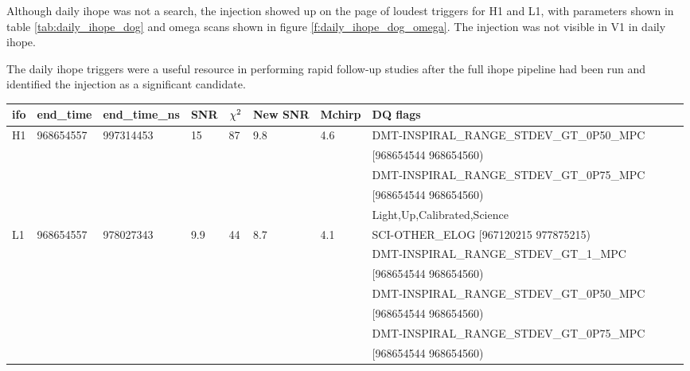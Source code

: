 Although daily ihope was not a search, the injection showed up on the
page of loudest triggers for H1 and L1, with parameters shown in table
\ref{tab:daily_ihope_dog} and omega scans shown in figure
\ref{f:daily_ihope_dog_omega}.  The injection was not visible in V1 in
daily ihope.


The daily ihope triggers were a useful resource in performing rapid
follow-up studies after the full ihope pipeline had been run and
identified the injection as a significant candidate.

\begin{landscape}
\begin{table}
\begin{center}
\begin{tabular}{lllllllllll}
\hline
ifo & end\_time & end\_time\_ns & SNR & $\chi^2$ & New SNR & Mchirp & DQ flags \\
\hline
H1  & 968654557 & 997314453 & 15 & 87 & 9.8 & 4.6 & DMT-INSPIRAL\_RANGE\_STDEV\_GT\_0P50\_MPC \\
    &           &           &    &     &    &     & \hspace*{0.5 in} [968654544 968654560) \\
    &           &           &    &     &    &     & DMT-INSPIRAL\_RANGE\_STDEV\_GT\_0P75\_MPC \\
    &           &           &    &     &    &     & \hspace*{0.5 in} [968654544 968654560) \\
    &           &           &    &     &    &     & Light,Up,Calibrated,Science \\
\hline
L1 & 968654557 & 978027343 & 9.9 & 44 & 8.7 & 4.1 & SCI-OTHER\_ELOG [967120215 977875215) \\
    &           &           &    &     &    &     & DMT-INSPIRAL\_RANGE\_STDEV\_GT\_1\_MPC \\
    &           &           &    &     &    &     & \hspace*{0.5 in} [968654544 968654560) \\
    &           &           &    &     &    &     & DMT-INSPIRAL\_RANGE\_STDEV\_GT\_0P50\_MPC \\
    &           &           &    &     &    &     & \hspace*{0.5 in} [968654544 968654560) \\
    &           &           &    &     &    &     & DMT-INSPIRAL\_RANGE\_STDEV\_GT\_0P75\_MPC \\
    &           &           &    &     &    &     & \hspace*{0.5 in} [968654544 968654560) \\

\end{tabular}
\end{center}
\end{table}
\end{landscape}
